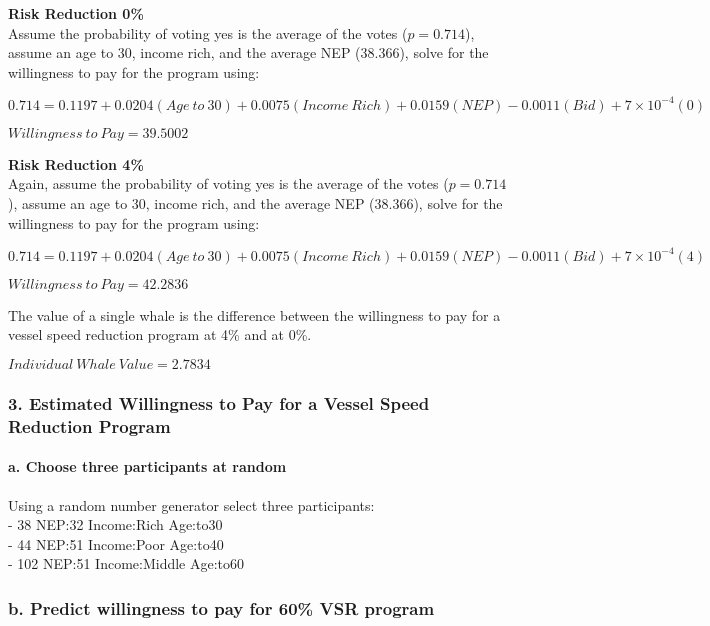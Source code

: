 \documentclass[]{article}
\let\oldparagraph\paragraph
\renewcommand{\paragraph}[1]{\oldparagraph{#1}\mbox{}}
\begin{document}
\textbf{Risk Reduction 0\%}\\
Assume the probability of voting yes is the average of the votes
(\(p = 0.714\)), assume an age to 30, income rich, and the average NEP
(38.366), solve for the willingness to pay for the program using:

\(0.714 = 0.1197 + 0.0204(Age~to~30) + 0.0075(Income~Rich) + 0.0159(NEP) - 0.0011(Bid) + 7\times 10^{-4}(0)\)

\(Willingness~to~Pay = 39.5002\)

\textbf{Risk Reduction 4\%}\\
Again, assume the probability of voting yes is the average of the votes
(\(p = 0.714\)), assume an age to 30, income rich, and the average NEP
(38.366), solve for the willingness to pay for the program using:

\(0.714 = 0.1197 + 0.0204(Age~to~30) + 0.0075(Income~Rich) + 0.0159(NEP) - 0.0011(Bid) + 7\times 10^{-4}(4)\)

\(Willingness~to~Pay = 42.2836\)

The value of a single whale is the difference between the willingness to
pay for a vessel speed reduction program at 4\% and at 0\%.

\(Individual~Whale~Value = 2.7834\)

\subsubsection{3. Estimated Willingness to Pay for a Vessel Speed
Reduction
Program}\label{estimated-willingness-to-pay-for-a-vessel-speed-reduction-program}

\paragraph{a. Choose three participants at
random}\label{a.-choose-three-participants-at-random}

Using a random number generator select three participants:\\
- 38 NEP:32 Income:Rich Age:to30\\
- 44 NEP:51 Income:Poor Age:to40\\
- 102 NEP:51 Income:Middle Age:to60

\subsubsection{b. Predict willingness to pay for 60\% VSR
program}\label{b.-predict-willingness-to-pay-for-60-vsr-program}
\end{document}
